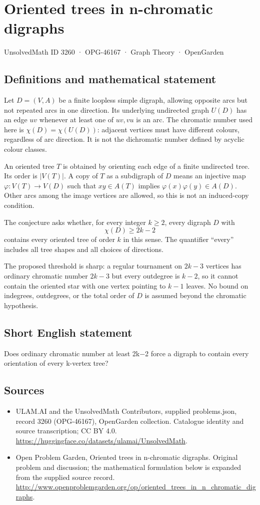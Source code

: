 \documentclass[11pt,a4paper]{article}
\begin{document}
\section*{Oriented trees in n-chromatic digraphs}\label{3260}
{\small UnsolvedMath ID 3260 · OPG-46167 · Graph Theory · OpenGarden}
\subsection{Definitions and mathematical statement}
Let $D=(V,A)$ be a finite loopless simple digraph, allowing opposite arcs
but not repeated arcs in one direction. Its underlying undirected graph
$U(D)$ has an edge $uv$ whenever at least one of $uv,vu$ is an arc.
The chromatic number used here is $\chi(D)=\chi(U(D))$: adjacent vertices
must have different colours, regardless of arc direction. It is not
the dichromatic number defined by acyclic colour classes.

An oriented tree $T$ is obtained by orienting each edge of a finite
undirected tree. Its order is $|V(T)|$. A copy of $T$ as a subdigraph of
$D$ means an injective map $\varphi:V(T)\to V(D)$ such that
$xy\in A(T)$ implies $\varphi(x)\varphi(y)\in A(D)$. Other arcs among
the image vertices are allowed, so this is not an induced-copy condition.

The conjecture asks whether, for every integer $k\ge2$, every digraph
$D$ with
\[
                            \chi(D)\ge2k-2
\]
contains every oriented tree of order $k$ in this sense. The quantifier
``every'' includes all tree shapes and all choices of directions.

The proposed threshold is sharp: a regular tournament on $2k-3$ vertices
has ordinary chromatic number $2k-3$ but every outdegree is $k-2$, so it
cannot contain the oriented star with one vertex pointing to $k-1$
leaves. No bound on indegrees, outdegrees, or the total order of $D$
is assumed beyond the chromatic hypothesis.
\subsection{Short English statement}
Does ordinary chromatic number at least 2k−2 force a digraph to contain every orientation of every k-vertex tree?
\subsection{Sources}
\begin{itemize}
\item[S1] ULAM.AI and the UnsolvedMath Contributors, supplied problems.json, record 3260 (OPG-46167), OpenGarden collection. Catalogue identity and source transcription; CC BY 4.0.
\url{https://huggingface.co/datasets/ulamai/UnsolvedMath}.
\item[S2] Open Problem Garden, Oriented trees in n-chromatic digraphs. Original problem and discussion; the mathematical formulation below is expanded from the supplied source record.
\url{http://www.openproblemgarden.org/op/oriented_trees_in_n_chromatic_digraphs}.
\end{itemize}
\end{document}
